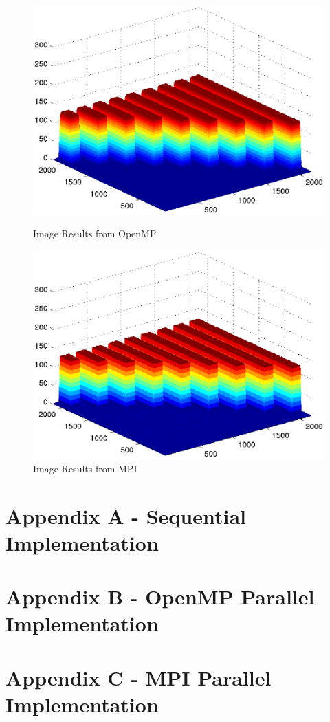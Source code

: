 \documentclass{article}
\begin{document}
\begin{figure}[htbp]
\begin{minipage}[b]{0.5\linewidth}
\centering
\includegraphics[width=\linewidth]{openmp-image.eps}
\caption{Image Results from OpenMP}
\label{fig:ompimg}
\end{minipage}
\hspace{0.5cm}
\begin{minipage}[b]{0.5\linewidth}
\centering
\includegraphics[width=\linewidth]{mpi-image.eps}
\caption{Image Results from MPI}
\label{fig:mpiimg}
\end{minipage}
\end{figure}


\newpage
\section*{Appendix A - Sequential Implementation}


\newpage
\section*{Appendix B - OpenMP Parallel Implementation}


\newpage
\section*{Appendix C - MPI Parallel Implementation}

\end{document}
